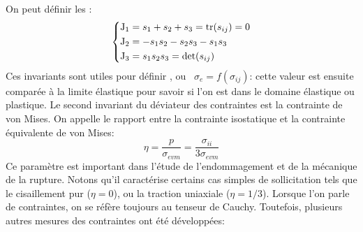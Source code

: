 On peut définir les :
\begin{equation}
\left\{\begin{aligned} 
\mathrm{J}_1 &= s_{1} + s_{2} + s_{3} = \operatorname{tr}(s_{ij}) = 0 \\
\mathrm{J}_2 &= - s_1 s_2 - s_2 s_3 - s_1 s_3 \\
\mathrm{J}_3 &= s_1 s_2 s_3 = \det(s_{ij})
\end{aligned}\right.
\end{equation}
Ces invariants sont utiles pour définir ,
ou ~$\sigma_e=f(\sigma_{ij})$:
cette valeur est ensuite comparée à la limite élastique pour savoir si l'on est dans le domaine
élastique ou plastique.
\medskipvm
Le second invariant du déviateur des contraintes est la contrainte de von
Mises.
\medskipvm
On appelle  le rapport entre la contrainte
isostatique et la contrainte équivalente de von Mises:
\begin{equation} \eta = \frac{p}{\sigma_{e vm}} = \frac{\sigma_{ii}}{3\sigma_{e vm}} \end{equation}
Ce paramètre est important dans l'étude de l'endommagement et de la mécanique de la rupture.
Notons qu'il caractérise certains cas simples de sollicitation tels que
le cisaillement pur ($\eta= 0$), ou la traction uniaxiale ($\eta = 1/3$).
\medskipvm
Lorsque l'on parle de contraintes, on se réfère toujours au tenseur de Cauchy.
Toutefois, plusieurs autres mesures des contraintes ont été développées:
